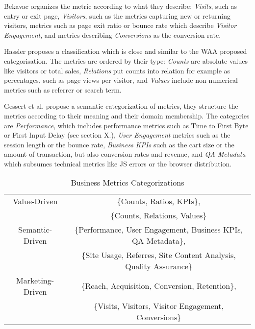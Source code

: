 Bekavac organizes the metric according to what they describe: \textit{Visits}, such as entry or exit page,
\textit{Visitors}, such as the metrics capturing new or returning visitors,
metrics such as page exit ratio or bounce rate which describe \textit{Visitor Engagement},
and metrics describing \textit{Conversions} as the conversion rate. %


Hassler proposes a classification which is close and similar to the WAA proposed categorisation.
The metrics are ordered by their type: %
\textit{Counts} are absolute values like visitors or total sales,
\textit{Relations} put counts into relation for example as percentages, such as page views per visitor,
and \textit{Values} include non-numerical metrics such as referrer or search term.

Gessert et al.  propose a semantic categorization of metrics, they structure the metrics according to their meaning and their domain membership.
The categories are \textit{Performance}, which includes performance metrics such as Time to First Byte or First Input Delay (see section X.), \textit{User Engagement} metrics such as the session length or the bounce rate, \textit{Business KPIs} such as the cart size or the amount of transaction, but also conversion rates and revenue, and \textit{QA Metadata} which subsumes technical metrics like JS errors or the browser distribution.%





\begin{table}[h!]
\begin{center}
\begin{tabular}{  c | c  }
Value-Driven & \{Counts, Ratios, KPIs\},  \\
 & \{Counts, Relations, Values\} \\
\hline
Semantic-Driven & \{Performance, User Engagement, Business KPIs, QA Metadata\},  \\
& \{Site Usage, Referres, Site Content Analysis, Quality Assurance\} \\
\hline
Marketing-Driven & \{Reach, Acquisition, Conversion, Retention\}, \\
& \{Visits, Visitors, Visitor Engagement, Conversions\} \\
\end{tabular}
\caption{Business Metrics Categorizations}
\end{center}
\end{table}



